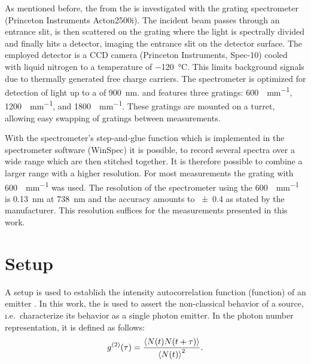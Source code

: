 		As mentioned before, the \fl from the \sivs is investigated with the grating spectrometer (Princeton Instruments Acton2500i).
		The incident beam passes through an entrance slit, is then scattered on the grating where the light is spectrally divided and finally hits a detector, imaging the entrance slit on the detector surface.
		The employed detector is a CCD camera (Princeton Instruments, Spec-10) cooled with liquid nitrogen to a temperature of \SI{-120}{\celsius}. This limits background signals due to thermally generated free charge carriers.
		The spectrometer is optimized for detection of light up to a \wl of \SI{900}{nm}.
		and features three gratings: \SI[per-mode=symbol]{600}{\lines\per\mm}, \SI[per-mode=symbol]{1200}{\lines\per\mm}, and \SI[per-mode=symbol]{1800}{\lines\per\mm}.
		These gratings are mounted on a turret, allowing easy swapping of gratings between measurements.

		With the spectrometer's step-and-glue function which is implemented in the spectrometer software (WinSpec) it is possible, to record several spectra over a wide \wl range which are then stitched together.
		It is therefore possible to combine a larger \wl range with a higher resolution.
		For most measurements the grating with \SI[per-mode=symbol]{600}{\lines\per\mm} was used.
		The resolution of the spectrometer using the \SI{600}{\lines\per\mm} is \SI{0.13}{nm} at \SI{738}{nm} and the accuracy amounts to \num{\pm0.4} as stated by the manufacturer.
		This resolution suffices for the measurements presented in this work.

	\section[HBT]{\HBT Setup}\label{sec::methods_hbt}

		A \HBT setup is used to establish the intensity autocorrelation function (\gt function) of an emitter \cite{brown1956correlation, brown1956test}.
		In this work, the \gtf is used to assert the non-classical behavior of a \pl source, \i.e.\ characterize its behavior as a single photon emitter.
		In the photon number representation, it is defined as follows:
		\begin{equation}
		g^{(2)}(\tau) = \frac{ \left\langle  N(t) N(t+\tau) \right\rangle }{\left\langle N(t)\right\rangle^2}.
		\end{equation}

